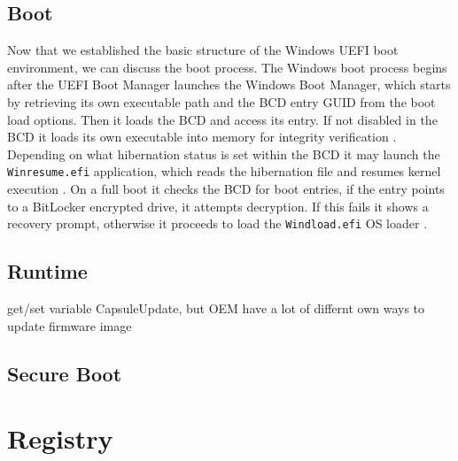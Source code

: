 \subsection{Boot}

Now that we established the basic structure of the Windows UEFI boot environment, we can discuss the boot process.
The Windows boot process begins after the UEFI Boot Manager launches the Windows Boot Manager, which starts by retrieving its own executable path and the \ac{BCD} entry GUID from the boot load options.
Then it loads the \ac{BCD} and access its entry.
If not disabled in the \ac{BCD} it loads its own executable into memory for integrity verification \cite[12. The Windows Boot Manager]{windows-internals-7-part2}.
Depending on what hibernation status is set within the \ac{BCD} it may launch the \lstinline{Winresume.efi} application, which reads the hibernation file and resumes kernel execution \cite[12. Launching a boot application]{windows-internals-7-part2}.
On a full boot it checks the \ac{BCD} for boot entries, if the entry points to a BitLocker encrypted drive, it attempts decryption.
If this fails it shows a recovery prompt, otherwise it proceeds to load the \lstinline{Windload.efi} \ac{OS} loader \cite[12. Launching a boot application]{windows-internals-7-part2}.

\cite[12. Launching a boot application]{windows-internals-7-part2}

\subsection{Runtime}

get/set variable
CapsuleUpdate, but OEM have a lot of differnt own ways to update firmware image

\subsection{Secure Boot}

\section{Registry}


